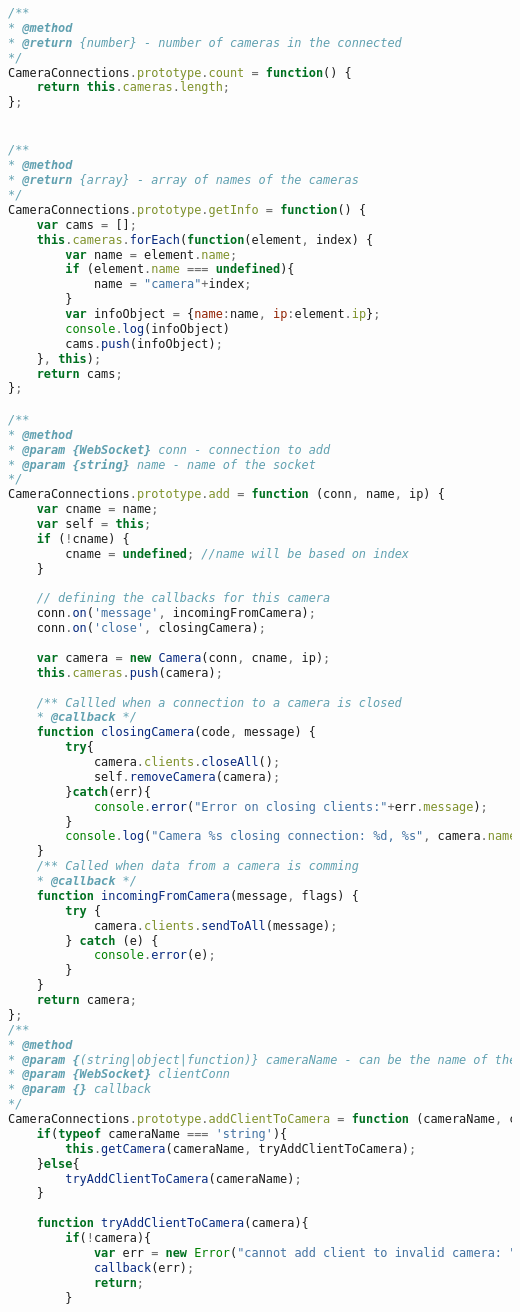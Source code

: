 \documentclass[hidelinks,11pt,a4paper,oneside,article]{memoir}
\begin{document}
\begin{lstlisting}[label={listing:nodejsimplementation},caption={implementation of server-side classes},language=JavaScript, style=styleprogrammingappendix]
/**
* @method
* @return {number} - number of cameras in the connected
*/
CameraConnections.prototype.count = function() {
    return this.cameras.length;
};


/**
* @method
* @return {array} - array of names of the cameras
*/
CameraConnections.prototype.getInfo = function() {
    var cams = [];
    this.cameras.forEach(function(element, index) {
        var name = element.name;
        if (element.name === undefined){
            name = "camera"+index;
        }
        var infoObject = {name:name, ip:element.ip};
        console.log(infoObject)
        cams.push(infoObject);
    }, this);
    return cams;    
};

/**
* @method
* @param {WebSocket} conn - connection to add
* @param {string} name - name of the socket
*/
CameraConnections.prototype.add = function (conn, name, ip) {
    var cname = name;
    var self = this;
    if (!cname) {
        cname = undefined; //name will be based on index
    }
    
    // defining the callbacks for this camera
    conn.on('message', incomingFromCamera);
    conn.on('close', closingCamera);
    
    var camera = new Camera(conn, cname, ip);
    this.cameras.push(camera);
    
    /** Callled when a connection to a camera is closed
    * @callback */
    function closingCamera(code, message) {
        try{
            camera.clients.closeAll();
            self.removeCamera(camera);
        }catch(err){
            console.error("Error on closing clients:"+err.message);
        }
        console.log("Camera %s closing connection: %d, %s", camera.name, code, message);
    }
    /** Called when data from a camera is comming
    * @callback */
    function incomingFromCamera(message, flags) {
        try {
            camera.clients.sendToAll(message);
        } catch (e) {
            console.error(e);
        }
    }
    return camera;
};
/**
* @method
* @param {(string|object|function)} cameraName - can be the name of the camera or a Camera object
* @param {WebSocket} clientConn
* @param {} callback
*/
CameraConnections.prototype.addClientToCamera = function (cameraName, clientConn, callback) {
    if(typeof cameraName === 'string'){
        this.getCamera(cameraName, tryAddClientToCamera);
    }else{
        tryAddClientToCamera(cameraName);
    }
    
    function tryAddClientToCamera(camera){
        if(!camera){
            var err = new Error("cannot add client to invalid camera: "+camera);
            callback(err);
            return;
        }
        

\end{lstlisting}
\end{document}
